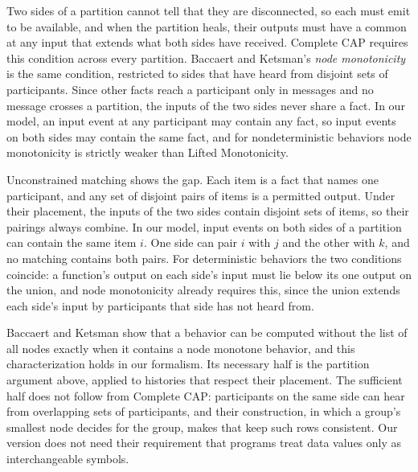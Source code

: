 Two sides of a partition cannot tell that they are disconnected, so each must
emit to be available, and when the partition heals, their outputs must have a
common \outnoun at any input that extends what both sides have received.
Complete CAP requires this condition across every partition.  Baccaert and
Ketsman's \emph{node monotonicity} is the same condition, restricted to sides
that have heard from disjoint sets of participants.  Since other facts reach a
participant only in messages and no message crosses a partition, the inputs of
the two sides never share a fact.  In our model, an input event at any
participant may contain any fact, so input events on both sides may contain
the same fact, and for nondeterministic behaviors node monotonicity is strictly
weaker than Lifted Monotonicity.

Unconstrained matching shows the gap.  Each item is a fact that names one
participant, and any set of disjoint pairs of items is a permitted output.
Under their placement, the inputs of the two sides contain disjoint sets of
items, so their pairings always combine.  In our model, input events on both
sides of a partition can contain the same item $i$.  One side can pair $i$ with
$j$ and the other with $k$, and no matching contains both pairs.  For
deterministic behaviors the two conditions coincide: a function's output on
each side's input must lie below its one output on the union, and node
monotonicity already requires this, since the union extends each side's input
by participants that side has not heard from.

Baccaert and Ketsman show that a behavior can be computed without the list of
all nodes exactly when it contains a node monotone behavior, and this
characterization holds in our formalism.  Its necessary half is the partition
argument above, applied to histories that respect their placement.  The
sufficient half does not follow from Complete CAP: participants on the same
side can hear from overlapping sets of participants, and their construction,
in which a group's smallest node decides for the group, makes \commitments that keep such rows consistent.  Our version does not need their requirement that
programs treat data values only as interchangeable symbols.


